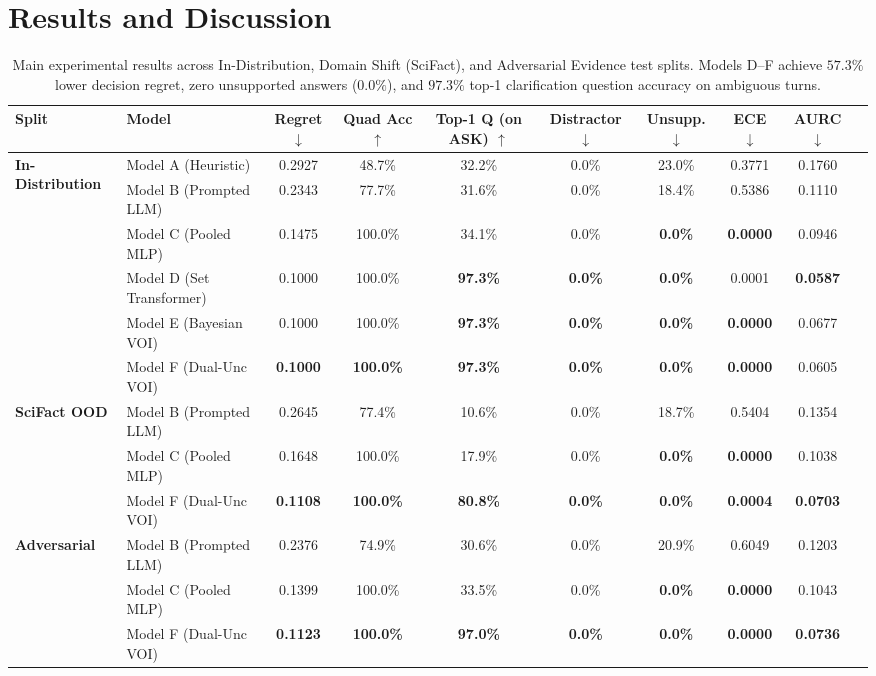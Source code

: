 \section{Results and Discussion}
\label{sec:results}

\begin{table}[t]
\centering
\small
\caption{Main experimental results across In-Distribution, Domain Shift (SciFact), and Adversarial Evidence test splits. Models D--F achieve $57.3\%$ lower decision regret, zero unsupported answers ($0.0\%$), and $97.3\%$ top-1 clarification question accuracy on ambiguous turns.}
\label{tab:main_results}
\begin{tabular}{llcccccccc}
\toprule
\textbf{Split} & \textbf{Model} & \textbf{Regret} $\downarrow$ & \textbf{Quad Acc} $\uparrow$ & \textbf{Top-1 Q (on ASK)} $\uparrow$ & \textbf{Distractor} $\downarrow$ & \textbf{Unsupp.} $\downarrow$ & \textbf{ECE} $\downarrow$ & \textbf{AURC} $\downarrow$ \\
\midrule
\multirow{6}{*}{\textbf{In-Distribution}} 
& Model A (Heuristic) & 0.2927 & 48.7\% & 32.2\% & 0.0\% & 23.0\% & 0.3771 & 0.1760 \\
& Model B (Prompted LLM) & 0.2343 & 77.7\% & 31.6\% & 0.0\% & 18.4\% & 0.5386 & 0.1110 \\
& Model C (Pooled MLP) & 0.1475 & 100.0\% & 34.1\% & 0.0\% & \textbf{0.0\%} & \textbf{0.0000} & 0.0946 \\
& Model D (Set Transformer) & 0.1000 & 100.0\% & \textbf{97.3\%} & \textbf{0.0\%} & \textbf{0.0\%} & 0.0001 & \textbf{0.0587} \\
& Model E (Bayesian VOI) & 0.1000 & 100.0\% & \textbf{97.3\%} & \textbf{0.0\%} & \textbf{0.0\%} & \textbf{0.0000} & 0.0677 \\
& Model F (Dual-Unc VOI) & \textbf{0.1000} & \textbf{100.0\%} & \textbf{97.3\%} & \textbf{0.0\%} & \textbf{0.0\%} & \textbf{0.0000} & 0.0605 \\
\midrule
\multirow{3}{*}{\textbf{SciFact OOD}} 
& Model B (Prompted LLM) & 0.2645 & 77.4\% & 10.6\% & 0.0\% & 18.7\% & 0.5404 & 0.1354 \\
& Model C (Pooled MLP) & 0.1648 & 100.0\% & 17.9\% & 0.0\% & \textbf{0.0\%} & \textbf{0.0000} & 0.1038 \\
& Model F (Dual-Unc VOI) & \textbf{0.1108} & \textbf{100.0\%} & \textbf{80.8\%} & \textbf{0.0\%} & \textbf{0.0\%} & \textbf{0.0004} & \textbf{0.0703} \\
\midrule
\multirow{3}{*}{\textbf{Adversarial}} 
& Model B (Prompted LLM) & 0.2376 & 74.9\% & 30.6\% & 0.0\% & 20.9\% & 0.6049 & 0.1203 \\
& Model C (Pooled MLP) & 0.1399 & 100.0\% & 33.5\% & 0.0\% & \textbf{0.0\%} & \textbf{0.0000} & 0.1043 \\
& Model F (Dual-Unc VOI) & \textbf{0.1123} & \textbf{100.0\%} & \textbf{97.0\%} & \textbf{0.0\%} & \textbf{0.0\%} & \textbf{0.0000} & \textbf{0.0736} \\
\bottomrule
\end{tabular}
\end{table}

